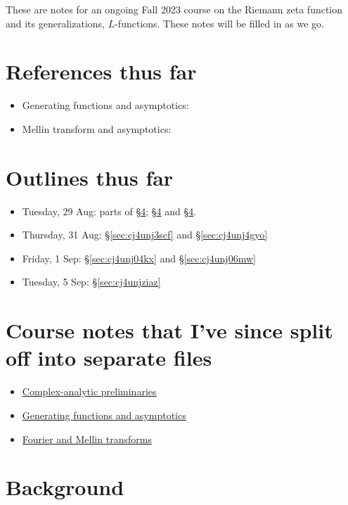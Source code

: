 \documentclass[reqno]{amsart}  \numberwithin{theorem}{section} \numberwithin{equation}{section}
\begin{document}
These are notes for an ongoing Fall 2023 course on the Riemann zeta function and its generalizations, $L$-functions.  These notes will be filled in as we go.

\section{References thus far}
\begin{itemize}
\item Generating functions and asymptotics: \cite[\S5.2]{MR2172781}
\item Mellin transform and asymptotics: \cite{zagier-mellin}
\end{itemize}

\section{Outlines thus far}
\begin{itemize}
\item Tuesday, 29 Aug: parts of \S\ref{sec:cj4unj5r3k}; \S\ref{sec:cj4unj5r3k} and \S\ref{sec:cj4unj5r3k}.
\item Thursday, 31 Aug: \S\ref{sec:cj4unj3scf} and \S\ref{sec:cj4unj4gyo}
\item Friday, 1 Sep: \S\ref{sec:cj4unj04kx} and \S\ref{sec:cj4unj06mw}
\item Tuesday, 5 Sep: \S\ref{sec:cj4unjziaz}
\end{itemize}


\section{Course notes that I've since split off into separate files}
\begin{itemize}
\item \href{20230907T143521--complex-analysis-preliminaries.pdf}{Complex-analytic preliminaries}
\item \href{20230907T142550--generating-functions-asymptotics.pdf}{Generating functions and asymptotics}
\item \href{20230907T143130--fourier-and-mellin-transforms.pdf}{Fourier and Mellin transforms}
\end{itemize}


\newpage


\section{Background}\label{sec:cj4unj5r3k}
\end{document}

